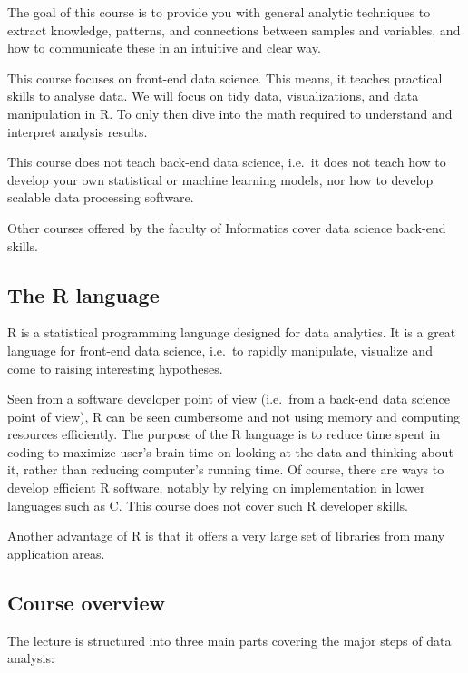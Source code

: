 \documentclass[
]{krantz}
\begin{document}
The goal of this course is to provide you with general analytic techniques to extract knowledge, patterns, and connections between samples and variables, and how to communicate these in an intuitive and clear way.

This course focuses on front-end data science. This means, it teaches practical skills to analyse data. We will focus on tidy data, visualizations, and data manipulation in R. To only then dive into the math required to understand and interpret analysis results.

This course does not teach back-end data science, i.e.~it does not teach how to develop your own statistical or machine learning models, nor how to develop scalable data processing software.

Other courses offered by the faculty of Informatics cover data science back-end skills.

\hypertarget{the-r-language}{%
\subsection*{The R language}\label{the-r-language}}

R is a statistical programming language designed for data analytics. It is a great language for front-end data science, i.e.~to rapidly manipulate, visualize and come to raising interesting hypotheses.

Seen from a software developer point of view (i.e.~from a back-end data science point of view), R can be seen cumbersome and not using memory and computing resources efficiently. The purpose of the R language is to reduce time spent in coding to maximize user's brain time on looking at the data and thinking about it, rather than reducing computer's running time. Of course, there are ways to develop efficient R software, notably by relying on implementation in lower languages such as C. This course does not cover such R developer skills.

Another advantage of R is that it offers a very large set of libraries from many application areas.

\hypertarget{course-overview}{%
\subsection*{Course overview}\label{course-overview}}

The lecture is structured into three main parts covering the major steps of data analysis:
\end{document}
